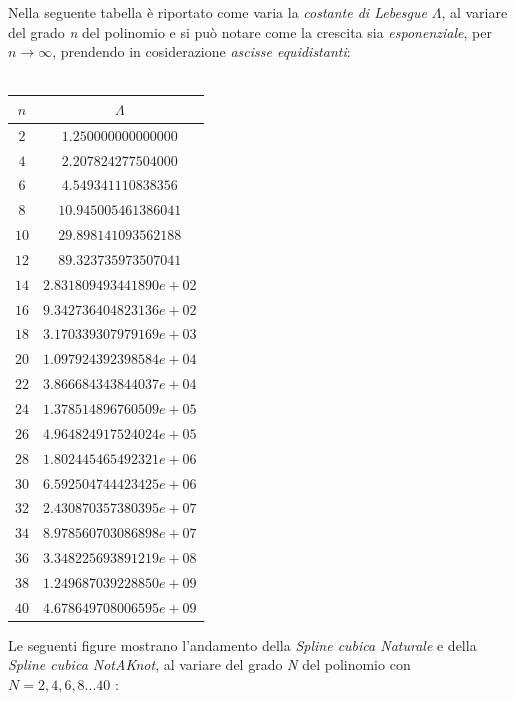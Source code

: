 Nella seguente tabella è riportato come varia la \textit{costante di Lebesgue} $\Lambda$, al variare del grado \textit{n} del polinomio e si può notare come la crescita sia \textit{esponenziale}, per $n\rightarrow\infty$, prendendo in cosiderazione \textit{ascisse equidistanti}:\\\
	\begin{center}
		\begin{tabular}{|c|c|}
			\hline
			$n$ & $\Lambda$ \\
			\hline
			$2$  & $1.250000000000000$ \\ 
			$4$  & $2.207824277504000$ \\ 
			$6$  & $4.549341110838356$ \\ 
			$8$  & $10.945005461386041$ \\ 
			$10$ & $29.898141093562188$ \\ 
			$12$ & $89.323735973507041$ \\ 
			$14$ & $2.831809493441890e+02$ \\ 
			$16$ & $9.342736404823136e+02$ \\ 
			$18$ & $3.170339307979169e+03$ \\ 
			$20$ & $1.097924392398584e+04$ \\ 
			$22$ & $3.866684343844037e+04$ \\ 
			$24$ & $1.378514896760509e+05$ \\ 
			$26$ & $4.964824917524024e+05$ \\ 
			$28$ & $1.802445465492321e+06$ \\ 
			$30$ & $6.592504744423425e+06$ \\ 
			$32$ & $2.430870357380395e+07$ \\ 
			$34$ & $8.978560703086898e+07$ \\ 
			$36$ & $3.348225693891219e+08$ \\ 
			$38$ & $1.249687039228850e+09$ \\ 
			$40$ & $4.678649708006595e+09$ \\ 
			\hline
		\end{tabular}
	\end{center}
Le seguenti figure mostrano l'andamento della \textit{Spline cubica Naturale} e della \textit{Spline cubica NotAKnot}, al variare del grado \textit{N} del polinomio con $N=2,4,6,8...40$ :\\\
